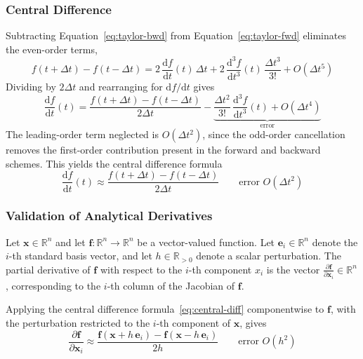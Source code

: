 \documentclass{article}
\newcommand{\pdc}[2]{\frac{\partial #1}{\partial #2}}
\begin{document}
\subsubsection{Central Difference}

Subtracting Equation~\eqref{eq:taylor-bwd} from Equation~\eqref{eq:taylor-fwd} eliminates
the even-order terms,
\begin{equation}
f(t+\Delta t) - f(t-\Delta t) = 2\,\frac{\mathrm{d}f}{\mathrm{d}t}(t)\,\Delta t
  + 2\,\frac{\mathrm{d}^3 f}{\mathrm{d}t^3}(t)\,\frac{\Delta t^3}{3!}
  + O(\Delta t^5)
\end{equation}
Dividing by $2\Delta t$ and rearranging for $\mathrm{d}f/\mathrm{d}t$ gives
\begin{equation}
\frac{\mathrm{d}f}{\mathrm{d}t}(t) = \frac{f(t+\Delta t) - f(t-\Delta t)}{2\Delta t}
  - 
  \underbrace{\frac{\Delta t^2}{3!}\,\frac{\mathrm{d}^3 f}{\mathrm{d}t^3}(t) + O(\Delta t^4)}_{\text{error}}
\end{equation}
The leading-order term neglected is $O(\Delta t^2)$, since the odd-order
cancellation removes the first-order contribution present in the forward
and backward schemes. This yields the central difference formula
\begin{equation}
\frac{\mathrm{d}f}{\mathrm{d}t}(t) \approx \frac{f(t+\Delta t) - f(t-\Delta t)}{2\Delta t}
  \qquad \text{error } O(\Delta t^2) \label{eq:central-diff}
\end{equation}

\subsubsection{Validation of Analytical Derivatives}

Let $\mathbf{x} \in \mathbb{R}^n$ and let $\mathbf{f} : \mathbb{R}^n \to
\mathbb{R}^n$ be a vector-valued function. Let $\mathbf{e}_i \in
\mathbb{R}^n$ denote the $i$-th standard basis vector, and let $h \in
\mathbb{R}_{>0}$ denote a scalar perturbation. The partial derivative of
$\mathbf{f}$ with respect to the $i$-th component $x_i$ is the vector
$\pdc{\mathbf{f}}{\mathbf{x}_i} \in \mathbb{R}^n$, corresponding to
the $i$-th column of the Jacobian of $\mathbf{f}$.

Applying the central difference formula~\eqref{eq:central-diff}
componentwise to $\mathbf{f}$, with the perturbation restricted to the
$i$-th component of $\mathbf{x}$, gives
\begin{equation}
\pdc{\mathbf{f}}{\mathbf{x}_i} \approx
  \frac{\mathbf{f}(\mathbf{x} + h\,\mathbf{e}_i) - \mathbf{f}(\mathbf{x} - h\,\mathbf{e}_i)}{2h}
  \qquad \text{error } O(h^2) \label{eq:central-diff-vec}
\end{equation}
\end{document}
